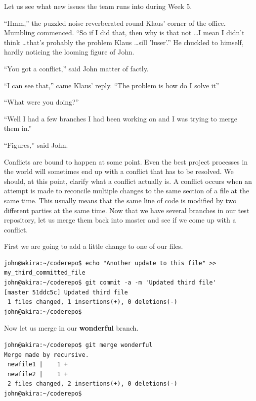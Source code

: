 Let us see what new issues the team runs into during Week 5.

\begin{trenches}
``Hmm,'' the puzzled noise reverberated round Klaus' corner of the office.  Mumbling commenced.  ``So if I did that, then why is that not \ldots I mean I didn't think \ldots that's probably the problem Klaus \ldots sill 'luser'.''  He chuckled to himself, hardly noticing the looming figure of John.

``You got a conflict,'' said John matter of factly.

``I can see that,'' came Klaus' reply.  ``The problem is how do I solve it''

``What were you doing?''

``Well I had a few branches I had been working on and I was trying to merge them in.''

``Figures,'' said John.  
\end{trenches}

Conflicts are bound to happen at some point.  Even the best project processes in the world will sometimes end up with a conflict that has to be resolved.  We should, at this point, clarify what a conflict actually is.  A conflict occurs when an attempt is made to reconcile multiple changes to the same section of a file at the same time.  This usually means that the same line of code is modified by two different parties at the same time.  Now that we have several branches in our test repository, let us merge them back into master and see if we come up with a conflict.

First we are going to add a little change to one of our files.

\begin{Verbatim}[frame=leftline,framerule=1mm,fontsize=\relsize{-3}] 
john@akira:~/coderepo$ echo "Another update to this file" >> my_third_committed_file 
john@akira:~/coderepo$ git commit -a -m 'Updated third file'
[master 51ddc5c] Updated third file
 1 files changed, 1 insertions(+), 0 deletions(-)
john@akira:~/coderepo$ 
\end{Verbatim}

Now let us merge in our \textbf{wonderful} branch.

\begin{Verbatim}[frame=leftline,framerule=1mm,fontsize=\relsize{-3}] 
john@akira:~/coderepo$ git merge wonderful
Merge made by recursive.
 newfile1 |    1 +
 newfile2 |    1 +
 2 files changed, 2 insertions(+), 0 deletions(-)
john@akira:~/coderepo$ 
\end{Verbatim}

